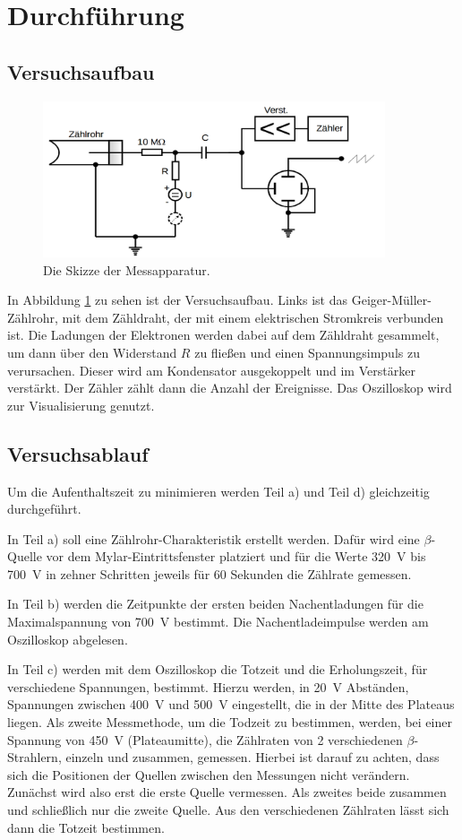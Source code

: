\documentclass[
  bibliography=totoc,     %
  captions=tableheading,  %
  titlepage=firstiscover, %
]{scrartcl}
\begin{document}
\section{Durchführung}
\subsection{Versuchsaufbau}
\begin{figure}[htb]
  \centering
  \includegraphics[width=0.9\textwidth]{V7035.png}
  \caption{Die Skizze der Messapparatur.}
  \label{fig:V7035}
\end{figure}
In Abbildung \ref{fig:V7035} zu sehen ist der Versuchsaufbau. Links ist das
Geiger-Müller-Zählrohr, mit dem Zähldraht, der mit einem
elektrischen Stromkreis verbunden ist. Die Ladungen der Elektronen werden dabei
auf dem Zähldraht gesammelt, um dann über den Widerstand $R$ zu fließen
und einen Spannungsimpuls zu verursachen. Dieser wird am Kondensator
ausgekoppelt und im Verstärker verstärkt. Der Zähler zählt dann die Anzahl
der Ereignisse. Das Oszilloskop wird zur Visualisierung genutzt.
\subsection{Versuchsablauf}
Um die Aufenthaltszeit zu minimieren werden Teil a) und Teil d) gleichzeitig
durchgeführt.

In Teil a) soll eine Zählrohr-Charakteristik erstellt werden. Dafür wird eine
$\beta$-Quelle vor dem Mylar-Eintrittsfenster platziert und für die Werte
\SI{320}{\volt} bis \SI{700}{\volt} in zehner Schritten jeweils für 60 Sekunden
die Zählrate gemessen.

In Teil b) werden die Zeitpunkte der ersten beiden Nachentladungen für die
Maximalspannung von \SI{700}{\volt} bestimmt. Die Nachentladeimpulse werden am
Oszilloskop abgelesen.

In Teil c) werden mit dem Oszilloskop die Totzeit und die Erholungszeit, für
verschiedene Spannungen, bestimmt. Hierzu werden, in \SI{20}{\volt} Abständen,
Spannungen zwischen \SI{400}{\volt} und \SI{500}{\volt} eingestellt, die in
der Mitte des Plateaus liegen.
Als zweite Messmethode, um die Todzeit zu bestimmen, werden, bei einer Spannung
von \SI{450}{\volt} (Plateaumitte), die Zählraten von 2 verschiedenen $\beta$-Strahlern,
einzeln und zusammen, gemessen. Hierbei ist darauf zu achten, dass sich die Positionen
der Quellen zwischen den Messungen nicht verändern. Zunächst wird also erst die erste
Quelle vermessen. Als zweites beide zusammen und schließlich nur die zweite Quelle.
Aus den verschiedenen Zählraten lässt sich dann die Totzeit bestimmen.
\end{document}
